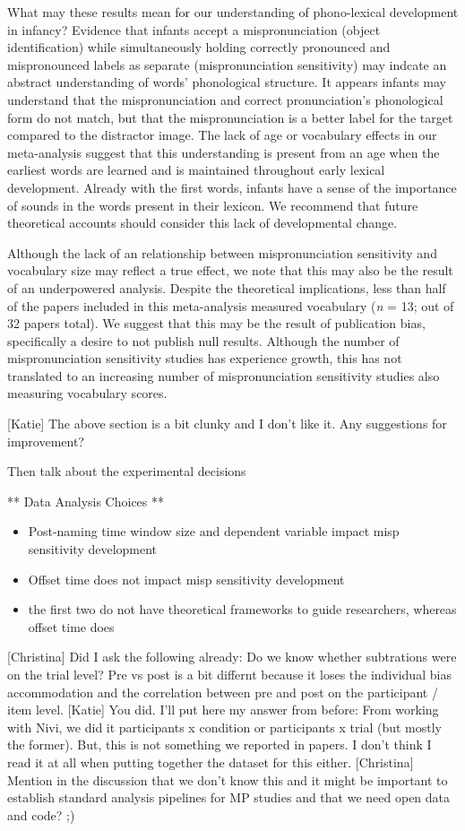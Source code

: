 \documentclass[man]{apa6}
\providecommand{\tightlist}{%
  \setlength{\itemsep}{0pt}\setlength{\parskip}{0pt}}
\theoremstyle{definition}
\theoremstyle{definition}
\theoremstyle{definition}
\theoremstyle{remark}
\begin{document}
What may these results mean for our understanding of phono-lexical
development in infancy? Evidence that infants accept a mispronunciation
(object identification) while simultaneously holding correctly
pronounced and mispronounced labels as separate (mispronunciation
sensitivity) may indcate an abstract understanding of words'
phonological structure. It appears infants may understand that the
mispronunciation and correct pronunciation's phonological form do not
match, but that the mispronunciation is a better label for the target
compared to the distractor image. The lack of age or vocabulary effects
in our meta-analysis suggest that this understanding is present from an
age when the earliest words are learned and is maintained throughout
early lexical development. Already with the first words, infants have a
sense of the importance of sounds in the words present in their lexicon.
We recommend that future theoretical accounts should consider this lack
of developmental change.

Although the lack of an relationship between mispronunciation
sensitivity and vocabulary size may reflect a true effect, we note that
this may also be the result of an underpowered analysis. Despite the
theoretical implications, less than half of the papers included in this
meta-analysis measured vocabulary (\emph{n} = 13; out of 32 papers
total). We suggest that this may be the result of publication bias,
specifically a desire to not publish null results. Although the number
of mispronunciation sensitivity studies has experience growth, this has
not translated to an increasing number of mispronunciation sensitivity
studies also measuring vocabulary scores.

{[}Katie{]} The above section is a bit clunky and I don't like it. Any
suggestions for improvement?

Then talk about the experimental decisions

** Data Analysis Choices **

\begin{itemize}
\tightlist
\item
  Post-naming time window size and dependent variable impact misp
  sensitivity development
\item
  Offset time does not impact misp sensitivity development
\item
  the first two do not have theoretical frameworks to guide researchers,
  whereas offset time does
\end{itemize}

{[}Christina{]} Did I ask the following already: Do we know whether
subtrations were on the trial level? Pre vs post is a bit differnt
because it loses the individual bias accommodation and the correlation
between pre and post on the participant / item level. {[}Katie{]} You
did. I'll put here my answer from before: From working with Nivi, we did
it participants x condition or participants x trial (but mostly the
former). But, this is not something we reported in papers. I don't think
I read it at all when putting together the dataset for this either.
{[}Christina{]} Mention in the discussion that we don't know this and it
might be important to establish standard analysis pipelines for MP
studies and that we need open data and code? ;)
\end{document}
